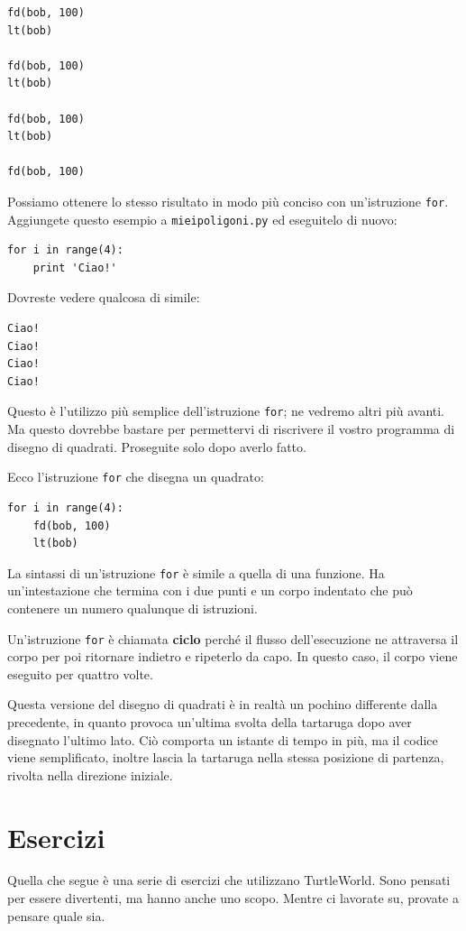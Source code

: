 \documentclass[10pt]{book}
\begin{document}
\begin{verbatim}
fd(bob, 100)
lt(bob)

fd(bob, 100)
lt(bob)

fd(bob, 100)
lt(bob)

fd(bob, 100)
\end{verbatim}
%
Possiamo ottenere lo stesso risultato in modo più conciso con un'istruzione {\tt for}. Aggiungete questo esempio a {\tt mieipoligoni.py} ed eseguitelo di nuovo:

\begin{verbatim}
for i in range(4):
    print 'Ciao!'
\end{verbatim}
%
Dovreste vedere qualcosa di simile:

\begin{verbatim}
Ciao!
Ciao!
Ciao!
Ciao!
\end{verbatim}
%
Questo è l'utilizzo più semplice dell'istruzione {\tt for}; ne vedremo altri più avanti. Ma questo dovrebbe bastare per permettervi di riscrivere il vostro programma di disegno di quadrati. Proseguite solo dopo averlo fatto.

Ecco l'istruzione {\tt for} che disegna un quadrato:

\begin{verbatim}
for i in range(4):
    fd(bob, 100)
    lt(bob)
\end{verbatim}
%
La sintassi di un'istruzione {\tt for} è simile a quella di una funzione. Ha un'intestazione che termina con i due punti e un corpo indentato che può contenere un numero qualunque di istruzioni.

Un'istruzione {\tt for} è chiamata {\bf ciclo} perché il flusso dell'esecuzione ne attraversa il corpo per poi ritornare indietro e ripeterlo da capo. In questo caso, il corpo viene eseguito per quattro volte.

Questa versione del disegno di quadrati è in realtà un pochino differente dalla precedente, in quanto provoca un'ultima svolta della tartaruga dopo aver disegnato l'ultimo lato. Ciò comporta un istante di tempo in più, ma il codice viene semplificato, inoltre lascia la tartaruga nella stessa posizione di partenza, rivolta nella direzione iniziale.

\section{Esercizi}

Quella che segue è una serie di esercizi che utilizzano TurtleWorld. Sono pensati per essere divertenti, ma hanno anche uno scopo. Mentre ci lavorate su, provate a pensare quale sia.
\end{document}
